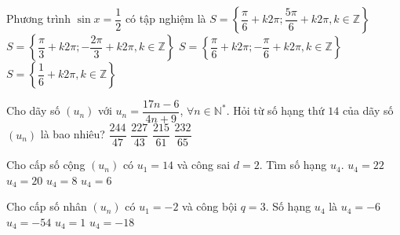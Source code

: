 \begin{ex}%
	Phương trình $\sin x = \dfrac{1}{2}$ có tập nghiệm là
	\choice
	{\True $S = \left\lbrace \dfrac{\pi}{6} + k2\pi; \dfrac{5\pi}{6} + k2\pi, k \in \mathbb{Z}\right\rbrace$}
	{$S = \left\lbrace \dfrac{\pi}{3} + k2\pi; -\dfrac{2\pi}{3} + k2\pi, k \in \mathbb{Z}\right\rbrace$}
	{$S = \left\lbrace \dfrac{\pi}{6} + k2\pi; -\dfrac{\pi}{6} + k2\pi, k \in \mathbb{Z}\right\rbrace$}
	{$S = \left\lbrace \dfrac{1}{6} + k2\pi, k \in \mathbb{Z}\right\rbrace$}
\end{ex}			
			
\begin{ex}%
	Cho dãy số $(u_n)$ với $u_n = \dfrac{17n - 6}{4n + 9}$, $\forall n \in \mathbb{N}^{*}$. Hỏi từ số hạng thứ $14$ của dãy số $(u_n)$ là bao nhiêu?
	\choice
	{$\dfrac{244}{47}$}
	{$\dfrac{227}{43}$}
	{$\dfrac{215}{61}$}
	{\True $\dfrac{232}{65}$}
\end{ex}				
				
\begin{ex}%
	Cho cấp số cộng $(u_n)$ có $u_1 = 14$ và công sai $d = 2$. Tìm số hạng $u_4$.
	\choice
	{$u_4 = 22$}
	{\True $u_4 = 20$}
	{$u_4 = 8$}
	{$u_4 = 6$}
\end{ex}					
					
\begin{ex}%
	Cho cấp số nhân $(u_n)$ có $u_1 = -2$ và công bội $q = 3$. Số hạng $u_4$ là
	\choice
	{$u_4 = -6$}
	{\True $u_4 = -54$}
	{$u_4 = 1$}
	{$u_4 = -18$}
\end{ex}					
					
